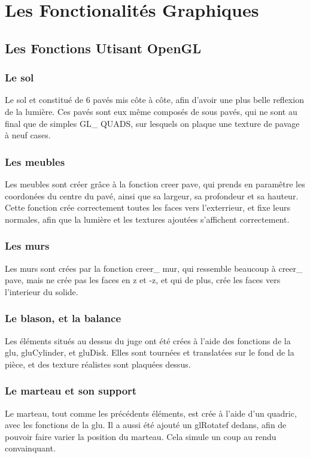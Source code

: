 \section{Les Fonctionalités Graphiques}

\subsection{Les Fonctions Utisant OpenGL}
	\subsubsection{Le sol}
	Le sol et constitué de 6 pavés mis côte à côte, afin d'avoir une plus belle reflexion de la lumière. Ces pavés sont eux même composés de sous pavés, qui ne sont au final que de simples GL\_ QUADS, sur lesquels on plaque une texture de pavage à neuf cases.
	
	\subsubsection{Les meubles}
	Les meubles sont créer grâce à la fonction creer pave, qui prends en paramêtre les coordonées du centre du pavé, ainsi que sa largeur, sa profondeur et sa hauteur. Cette fonction crée correctement toutes les faces vers l'exterrieur, et fixe leurs normales, afin que la lumière et les textures ajoutées s'affichent correctement.
	\subsubsection{Les murs}
	Les murs sont crées par la fonction creer\_ mur, qui ressemble beaucoup à creer\_ pave, mais ne crée pas les faces en z et -z, et qui de plus, crée les faces vers l'interieur du solide.
	\subsubsection{Le blason, et la balance}
	Les éléments situés au dessus du juge ont été crées à l'aide des fonctions de la glu, gluCylinder, et gluDisk. Elles sont tournées et translatées sur le fond de la pièce, et des texture réalistes sont plaquées dessus.
	\subsubsection{Le marteau et son support}
	Le marteau, tout comme les précédents éléments, est crée à l'aide d'un quadric, avec les fonctions de la glu. Il a aussi été ajouté un glRotatef dedans, afin de pouvoir faire varier la position du marteau. Cela simule un coup au rendu convainquant.
